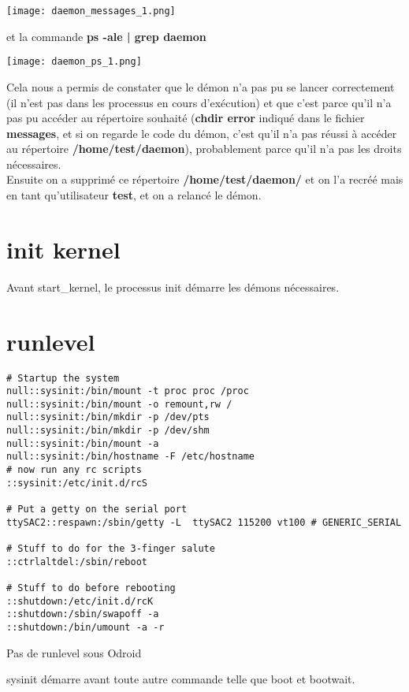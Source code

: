 \begin{center} 
\hspace{15cm}
\texttt{[image: daemon\_messages\_1.png]}
\end{center}
\vspace{0.5cm}

et la commande \textbf{ps -ale | grep daemon}

\begin{center} 
\hspace{15cm}
\texttt{[image: daemon\_ps\_1.png]}
\end{center}
\vspace{0.5cm}

Cela nous a permis de constater que le démon n'a pas pu se lancer correctement (il n'est pas dans les processus en cours d'exécution) et que c'est parce qu'il n'a pas pu accéder au répertoire souhaité (\textbf{chdir error} indiqué dans le fichier \textbf{messages}, et si on regarde le code du démon, c'est qu'il n'a pas réussi à accéder au répertoire \textbf{/home/test/daemon}), probablement parce qu'il n'a pas les droits nécessaires.\\

Ensuite on a supprimé ce répertoire \textbf{/home/test/daemon/} et on l'a recréé mais en tant qu'utilisateur \textbf{test}, et on a relancé le démon.

\section{init kernel}
Avant start\_kernel, le processus init démarre les démons nécessaires. 

\section{runlevel}
\begin{lstlisting}[style=Bash]
# Startup the system
null::sysinit:/bin/mount -t proc proc /proc
null::sysinit:/bin/mount -o remount,rw /
null::sysinit:/bin/mkdir -p /dev/pts
null::sysinit:/bin/mkdir -p /dev/shm
null::sysinit:/bin/mount -a
null::sysinit:/bin/hostname -F /etc/hostname
# now run any rc scripts
::sysinit:/etc/init.d/rcS

# Put a getty on the serial port
ttySAC2::respawn:/sbin/getty -L  ttySAC2 115200 vt100 # GENERIC_SERIAL

# Stuff to do for the 3-finger salute
::ctrlaltdel:/sbin/reboot

# Stuff to do before rebooting
::shutdown:/etc/init.d/rcK
::shutdown:/sbin/swapoff -a
::shutdown:/bin/umount -a -r
\end{lstlisting}
Pas de runlevel sous Odroid

sysinit démarre avant toute autre commande telle que boot et bootwait.
